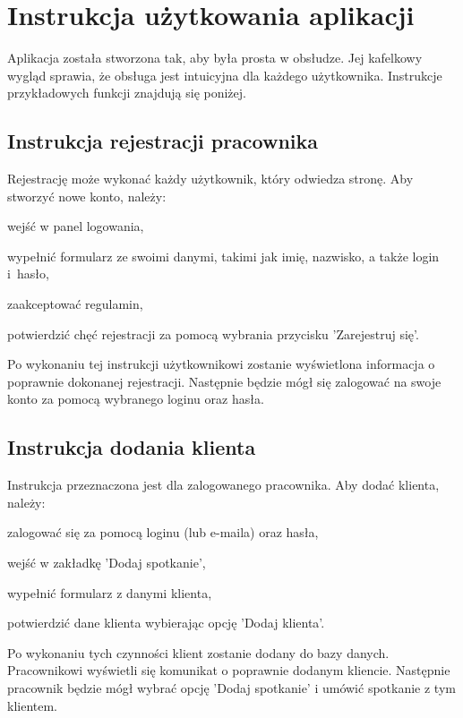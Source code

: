 \documentclass[eng,printmode,openany,oneside]{mgr}
\begin{document}
\section{Instrukcja użytkowania aplikacji}

Aplikacja została stworzona tak, aby była prosta w obsłudze. Jej kafelkowy wygląd sprawia, że obsługa jest intuicyjna dla każdego użytkownika. Instrukcje przykładowych funkcji znajdują się poniżej.

\subsection*{Instrukcja rejestracji pracownika}

Rejestrację może wykonać każdy użytkownik, który odwiedza stronę. Aby stworzyć nowe konto, należy:

	\begin{enumerate*}
		\item wejść w panel logowania,
		\item wypełnić formularz ze swoimi danymi, takimi jak imię, nazwisko, a także login i~hasło,
		\item zaakceptować regulamin,
		\item potwierdzić chęć rejestracji za pomocą wybrania przycisku 'Zarejestruj się'.
	\end{enumerate*}
	
Po wykonaniu tej instrukcji użytkownikowi zostanie wyświetlona informacja o poprawnie dokonanej rejestracji. Następnie będzie mógł się zalogować na swoje konto za pomocą wybranego loginu oraz hasła.

\subsection*{Instrukcja dodania klienta}

Instrukcja przeznaczona jest dla zalogowanego pracownika. Aby dodać klienta, należy:

	\begin{enumerate*}
		\item zalogować się za pomocą loginu (lub e-maila) oraz hasła,
		\item wejść w zakładkę 'Dodaj spotkanie',
		\item wypełnić formularz z danymi klienta,
		\item potwierdzić dane klienta wybierając opcję 'Dodaj klienta'.
	\end{enumerate*}
	
Po wykonaniu tych czynności klient zostanie dodany do bazy danych. Pracownikowi wyświetli się komunikat o poprawnie dodanym kliencie. Następnie pracownik będzie mógł wybrać opcję 'Dodaj spotkanie' i umówić spotkanie z tym klientem.
\end{document}
